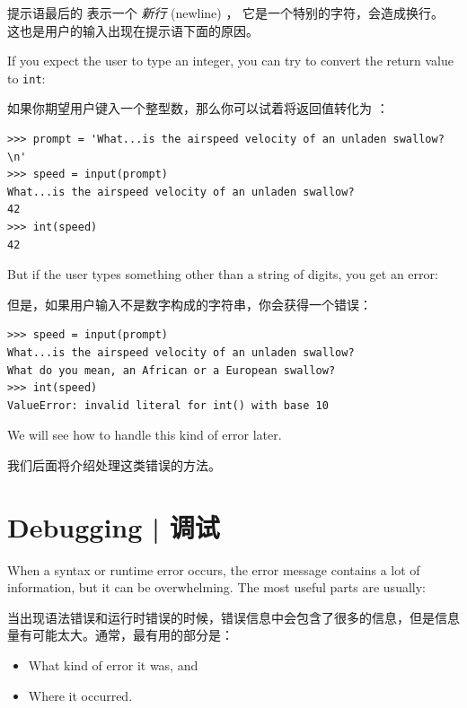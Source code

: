 {{{{提示语最后的 \li{\n} 表示一个 {\em 新行} (newline) ，
它是一个特别的字符，会造成换行。 这也是用户的输入出现在提示语下面的原因。

If you expect the user to type an integer, you can try to convert
the return value to {\tt int}:

如果你期望用户键入一个整型数，那么你可以试着将返回值转化为  ：

\begin{lstlisting}
>>> prompt = 'What...is the airspeed velocity of an unladen swallow?\n'
>>> speed = input(prompt)
What...is the airspeed velocity of an unladen swallow?
42
>>> int(speed)
42
\end{lstlisting}
%
But if the user types something other than a string of digits,
you get an error:

但是，如果用户输入不是数字构成的字符串，你会获得一个错误：

\begin{lstlisting}
>>> speed = input(prompt)
What...is the airspeed velocity of an unladen swallow?
What do you mean, an African or a European swallow?
>>> int(speed)
ValueError: invalid literal for int() with base 10
\end{lstlisting}

%
We will see how to handle this kind of error later.

我们后面将介绍处理这类错误的方法。
  


\section{Debugging  |  调试}
\label{whitespace}
  

When a syntax or runtime error occurs, the error message contains
a lot of information, but it can be overwhelming.  The most
useful parts are usually:

当出现语法错误和运行时错误的时候，错误信息中会包含了很多的信息，但是信息量有可能太大。通常，最有用的部分是：

\begin{itemize}

\item What kind of error it was, and

\item Where it occurred.

\end{itemize}

\begin{itemize}


\end{itemize}}}}}
